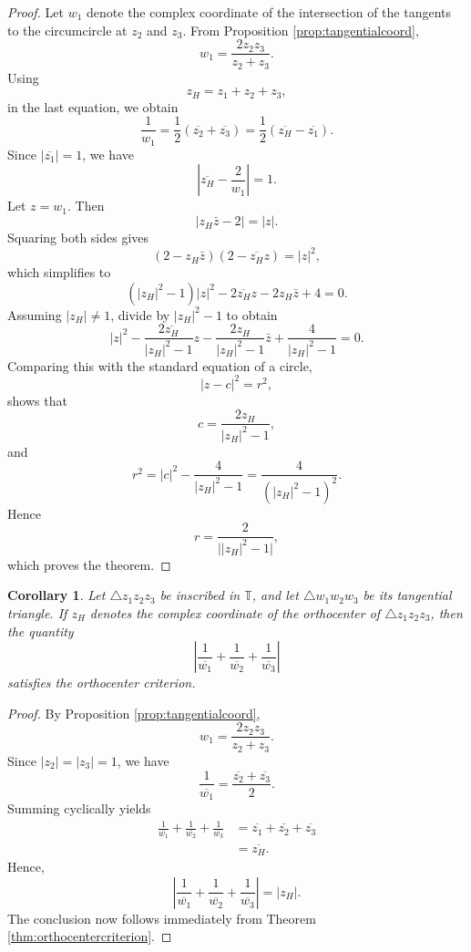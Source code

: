 \documentclass[11pt,reqno]{amsart}
\newtheorem{corollary}{Corollary}[section]
\theoremstyle{definition}
\numberwithin{equation}{section}
\begin{document}
\begin{proof}
Let $w_1$ denote the complex coordinate of the intersection of the tangents to the circumcircle at $z_2$ and $z_3$. From Proposition \ref{prop:tangentialcoord},
\[
w_1=\frac{2z_2z_3}{z_2+z_3}.
\]
Using  
\[
z_H=z_1+z_2+z_3,
\] 
in the last equation, we obtain
\[
    \frac1{w_1}
=\frac12\left(\overline{z_2}+\overline{z_3}\right)
=\frac12\left(\overline{z_H}-\overline{z_1}\right).
\]
Since $|\overline{z_1}|=1$, we have
\[
\left|\overline{z_H}-\frac{2}{w_1}\right|=1.
\]
Let $z=w_1$. Then
\[
|z_H\bar z-2|=|z|.
\]
Squaring both sides gives
\[
(2-z_H\bar z)(2-\overline{z_H}z)=|z|^2,
\]
which simplifies to
\[
(|z_H|^2-1)|z|^2
-2\overline{z_H}z
-2z_H\bar z
+4=0.
\]
Assuming $|z_H|\neq1$, divide by $|z_H|^2-1$ to obtain
\[
|z|^2
-\frac{2\overline{z_H}}{|z_H|^2-1}z
-\frac{2z_H}{|z_H|^2-1}\bar z
+\frac{4}{|z_H|^2-1}=0.
\]
Comparing this with the standard equation of a circle,
\[
|z-c|^2=r^2,
\]
shows that
\begin{equation}\label{eq:incentan}
    c=\frac{2z_H}{|z_H|^2-1},
\end{equation}
and
\[
r^2
=
|c|^2-\frac{4}{|z_H|^2-1}
=
\frac{4}{(|z_H|^2-1)^2}.
\]
Hence
\[
    r=\frac{2}{\bigl||z_H|^2-1\bigr|},
\]
which proves the theorem.
\end{proof}

\begin{corollary}
Let $\triangle z_1z_2z_3$ be inscribed in $\mathbb T$, and let $\triangle w_1w_2w_3$ be its tangential triangle. If $z_H$ denotes the complex coordinate of the orthocenter of $\triangle z_1z_2z_3$, then the quantity
\[
\left|
\frac{1}{\overline{w_1}}
+\frac{1}{\overline{w_2}}
+\frac{1}{\overline{w_3}}
\right|
\]
satisfies the orthocenter criterion.
\end{corollary}

\begin{proof}
By Proposition \ref{prop:tangentialcoord},
\[
w_1=\frac{2z_2z_3}{z_2+z_3}.
\]
Since $|z_2|=|z_3|=1$, we have
\[
\frac{1}{\overline{w_1}}
=
\frac{\overline{z_2}+\overline{z_3}}{2}.
\]
Summing cyclically yields
\begin{align*}
\frac{1}{\overline{w_1}}
+\frac{1}{\overline{w_2}}
+\frac{1}{\overline{w_3}}
&=
\overline{z_1}
+\overline{z_2}
+\overline{z_3} \\
&=
\overline{z_H}.
\end{align*}
Hence,
\[
\left|
\frac{1}{\overline{w_1}}
+\frac{1}{\overline{w_2}}
+\frac{1}{\overline{w_3}}
\right|
=
|z_H|.
\]
The conclusion now follows immediately from Theorem \ref{thm:orthocentercriterion}.
\end{proof}
\end{document}
